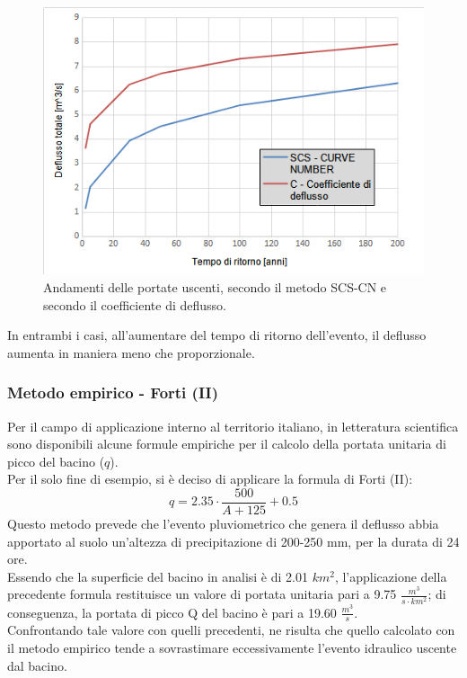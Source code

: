 \begin{figure}[H]  \centering
    \includegraphics[scale=0.75]{immagini/metodo_razionale_cn_c.png}
    \caption{Andamenti delle portate uscenti, secondo il metodo SCS-CN e secondo il coefficiente di deflusso.}
    \label{metodo_razionale_cn_c}
\end{figure}
In entrambi i casi, all'aumentare del tempo di ritorno dell'evento, il deflusso aumenta in maniera meno che proporzionale.

\subsubsection{Metodo empirico - Forti (II)}
Per il campo di applicazione interno al territorio italiano, in letteratura scientifica sono disponibili alcune formule empiriche per il calcolo della portata unitaria di picco del bacino ($q$).\\
Per il solo fine di esempio, si è deciso di applicare la formula di Forti (II):
\begin{equation}
    q = 2.35 \cdot \frac{500}{A+125}+0.5
\end{equation}
Questo metodo prevede che l'evento pluviometrico che genera il deflusso abbia apportato al suolo un'altezza di precipitazione di 200-250 mm, per la durata di 24 ore.\\
Essendo che la superficie del bacino in analisi è di 2.01 $km^2$, l'applicazione della precedente formula restituisce un valore di portata unitaria pari a 9.75 $\frac{m^3}{s \cdot km^2}$; di conseguenza, la portata di picco Q del bacino è pari a 19.60 $\frac{m^3}{s}$.\\
Confrontando tale valore con quelli precedenti, ne risulta che quello calcolato con il metodo empirico tende a sovrastimare eccessivamente l'evento idraulico uscente dal bacino.

